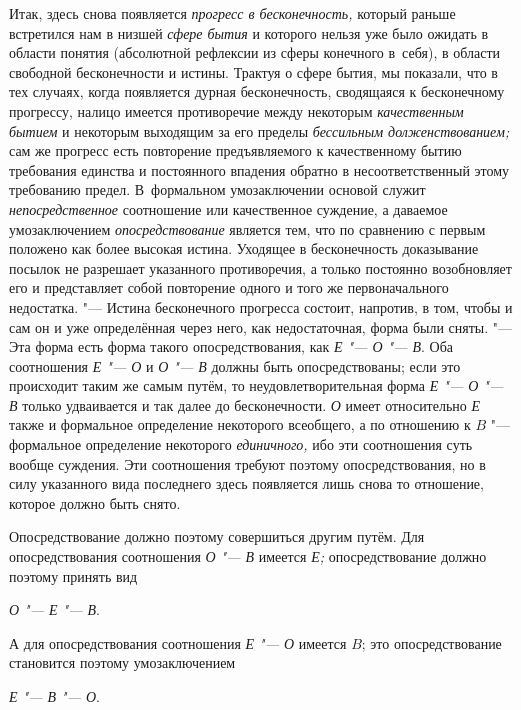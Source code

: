 Итак, здесь снова появляется
{\em прогресс в бесконечность,}
который раньше встретился нам в низшей
{\em сфере бытия} и
которого нельзя уже было ожидать в области понятия (абсолютной рефлексии из
сферы конечного в~себя), в области свободной бесконечности и истины.
Трактуя о сфере бытия, мы показали, что в тех случаях, когда появляется
дурная бесконечность, сводящаяся к бесконечному прогрессу, налицо имеется
противоречие между некоторым
{\em качественным бытием}
и некоторым выходящим за его пределы
{\em бессильным долженствованием;}
сам же прогресс есть повторение предъявляемого к
качественному бытию требования единства и постоянного впадения обратно в
несоответственный этому требованию предел. В~формальном умозаключении
основой служит {\em непосредственное}
соотношение или качественное суждение, а даваемое
умозаключением {\em опосредствование}
является тем, что по сравнению с первым положено как более
высокая истина. Уходящее в бесконечность доказывание посылок не разрешает
указанного противоречия, а только постоянно возобновляет его и представляет
собой повторение одного и того же первоначального недостатка. "---
Истина бесконечного прогресса состоит, напротив, в том, чтобы
и сам он и уже определённая через него, как недостаточная, форма были
сняты. "--- Эта форма есть форма такого опосредствования, как
{\em Е "--- О "--- В}. Оба соотношения {\em Е "--- О} и {\em О
"--- В} должны быть опосредствованы; если это
происходит таким же самым путём, то неудовлетворительная форма {\em Е "--- О
"--- В} только удваивается и так далее до
бесконечности. {\em О} имеет относительно {\em Е} также и
формальное определение некоторого всеобщего, а по отношению к
$B$ "--- формальное определение некоторого
{\em единичного,} ибо эти
соотношения суть вообще суждения. Эти соотношения требуют поэтому
опосредствования, но в силу указанного вида последнего здесь появляется
лишь снова то отношение, которое должно быть снято.

Опосредствование должно поэтому совершиться другим путём. Для
опосредствования соотношения {\em О "--- В} имеется
{\em Е;} опосредствование должно поэтому принять вид

{\centering
{\em О "--- Е
"--- В}.
\par}

А для опосредствования соотношения {\em Е "--- О}
имеется $B$; это опосредствование становится поэтому умозаключением

{\centering
{\em Е "--- В
"--- О}.
\par}

